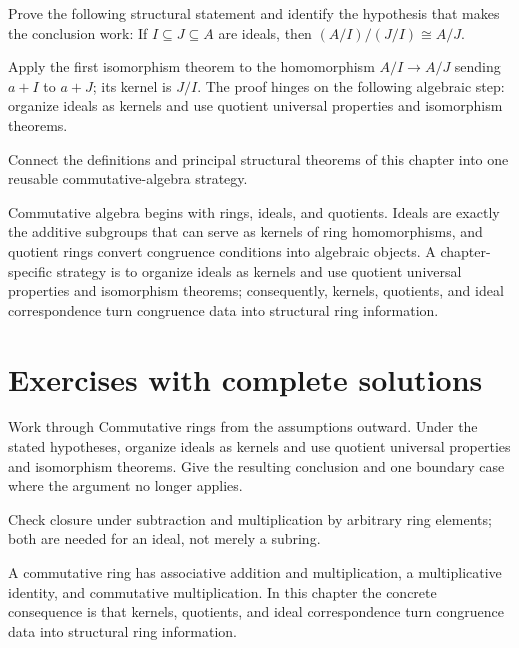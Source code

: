 \begin{problem}\label{prob:v01-problem-11}
Prove the following structural statement and identify the hypothesis that makes the conclusion work: If $I\subseteq J\subseteq A$ are ideals, then $(A/I)/(J/I)\cong A/J$.
\end{problem}
\begin{solution}
Apply the first isomorphism theorem to the homomorphism $A/I\to A/J$ sending $a+I$ to $a+J$; its kernel is $J/I$. The proof hinges on the following algebraic step: organize ideals as kernels and use quotient universal properties and isomorphism theorems.
\end{solution}

\begin{problem}\label{prob:v01-problem-12}
Connect the definitions and principal structural theorems of this chapter into one reusable commutative-algebra strategy.
\end{problem}
\begin{solution}
Commutative algebra begins with rings, ideals, and quotients. Ideals are exactly the additive subgroups that can serve as kernels of ring homomorphisms, and quotient rings convert congruence conditions into algebraic objects. A chapter-specific strategy is to organize ideals as kernels and use quotient universal properties and isomorphism theorems; consequently, kernels, quotients, and ideal correspondence turn congruence data into structural ring information.
\end{solution}

\section{Exercises with complete solutions}

\begin{exercise}\label{exr:v01-01}
Work through Commutative rings from the assumptions outward. Under the stated hypotheses, organize ideals as kernels and use quotient universal properties and isomorphism theorems. Give the resulting conclusion and one boundary case where the argument no longer applies.
\end{exercise}
\begin{hint}
Check closure under subtraction and multiplication by arbitrary ring elements; both are needed for an ideal, not merely a subring.
\end{hint}
\begin{solution}
A commutative ring has associative addition and multiplication, a multiplicative identity, and commutative multiplication. In this chapter the concrete consequence is that kernels, quotients, and ideal correspondence turn congruence data into structural ring information.
\end{solution}


